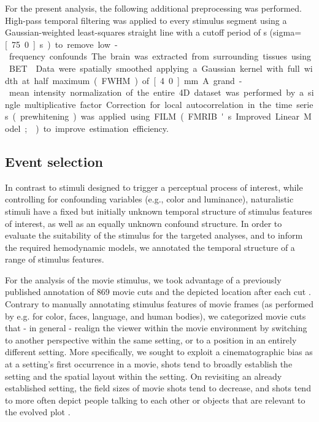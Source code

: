 \documentclass[english]{article}
\begin{document}
For the present analysis, the following additional preprocessing was performed.
High-pass temporal filtering was applied to every stimulus segment using a
Gaussian-weighted least-squares straight line with a cutoff period of
\unit[150]{s} (sigma=\unit[75.0]{s}) to remove low-frequency confounds.
The brain was extracted from surrounding tissues using BET \citep{smith2002bet}.
Data were spatially smoothed applying a Gaussian kernel with full width at half
maximum (FWHM) of \unit[4.0]{mm}.
A grand-mean intensity normalization of the entire 4D dataset was performed by a
single multiplicative factor.
Correction for local autocorrelation in the time series (prewhitening) was
applied using FILM (FMRIB's Improved Linear Model; \citep{woolrich2001autocorr})
to improve estimation efficiency.


\subsection{Event selection} \label{rationale}

In contrast to stimuli designed to trigger a perceptual process of interest,
while controlling for confounding variables (e.g., color and luminance),
naturalistic stimuli have a fixed but initially unknown temporal structure of
stimulus features of interest, as well as an equally unknown confound structure.
In order to evaluate the suitability of the stimulus for the targeted analyses,
and to inform the required hemodynamic models, we annotated the temporal
structure of a range of stimulus features.

For the analysis of the movie stimulus, we took advantage of a previously
published annotation of 869 movie cuts and the depicted location after each cut
\citep{haeusler2016cutanno}.
Contrary to manually annotating stimulus features of movie frames (as
performed by e.g. \cite{bartels2004mapping} for color, faces, language, and
human bodies), we categorized movie cuts that - in general - realign the viewer
within the movie environment by switching to another perspective within the
same setting, or to a position in an entirely different setting.
More specifically, we sought to exploit a cinematographic bias as
at a setting's first occurrence in a movie, shots tend to broadly establish the
setting and the spatial layout within the setting.
On revisiting an already established setting, the field sizes of movie shots
tend to decrease, and shots tend to more often depict people talking to each
other or objects that are relevant to the evolved plot
\citep{brown2012cinematography, katz1991film, mascelli1998five}.
\end{document}
